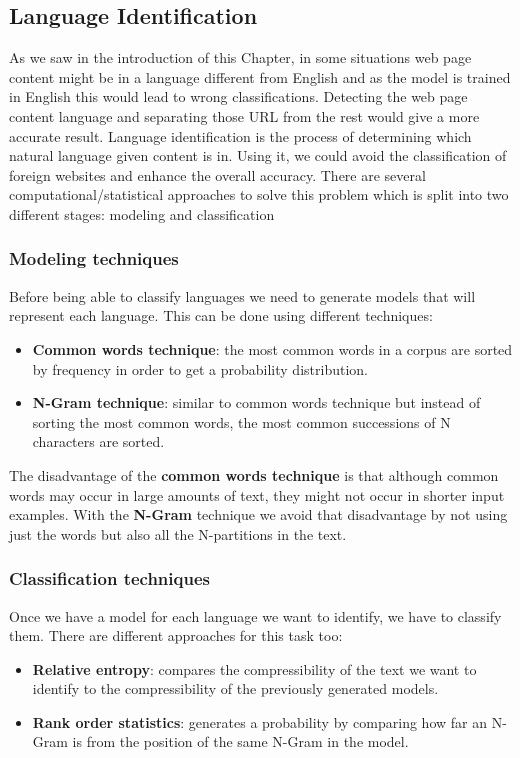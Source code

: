 \subsection{Language Identification}
As we saw in the introduction of this Chapter, in some situations web page content might be in a language different from English and as the model is trained in English this would lead to wrong 
classifications. Detecting the web page content language and separating those URL from the rest would give a more accurate result.
Language identification is the process of determining which natural language given content is in. Using it, we could avoid the classification of foreign websites and enhance the overall accuracy.
There are several computational/statistical approaches to solve this problem which is split into two different stages: modeling and classification

\subsubsection{Modeling techniques}
Before being able to classify languages we need to generate models that will represent each language. This can be done using different techniques:
\begin{itemize}
  \item {\bf Common words technique}: the most common words in a corpus are sorted by frequency in order to get a probability distribution.
  \item {\bf N-Gram technique}: similar to common words technique but instead of sorting the most common words, the most common successions of N characters are sorted.
\end{itemize}  
The disadvantage of the {\bf common words technique} is that although common words may occur in large amounts of text, they might not occur in shorter input examples. With the {\bf N-Gram} technique 
we avoid that disadvantage by not using just the words but also all the N-partitions in the text.


\subsubsection{Classification techniques}
Once we have a model for each language we want to identify, we have to classify them. There are different approaches for this task too:
\begin{itemize}
  \item {\bf Relative entropy}: compares the compressibility of the text we want to identify to the compressibility of the previously generated models.
  \item {\bf Rank order statistics}: generates a probability by comparing how far an N-Gram is from the position of the same N-Gram in the model.
\end{itemize}
